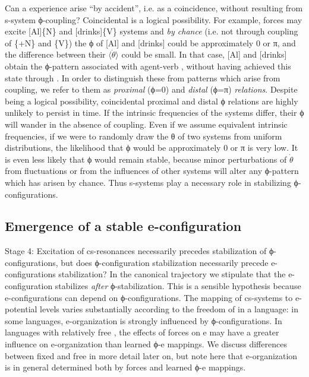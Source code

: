 Can a  experience arise “by accident”, i.e. as a coincidence, without resulting from s-system ϕ-coupling? Coincidental  is a logical possibility. For example,  forces may excite [Al]\{N\} and [drinks]\{V\} systems and \textit{by chance} (i.e. not through coupling of \{+N\} and \{V\}) the ϕ of [Al] and [drinks] could be approximately 0 or π, and the difference between their $\langle\dot{\theta}\rangle$ could be small. In that case, [Al] and [drinks] obtain the ϕ-pattern associated with agent-verb , without having achieved this state through . In order to distinguish these from patterns which arise from coupling, we refer to them as \textit{proximal} (ϕ=0) and \textit{distal} (ϕ=π) \textit{relations}. Despite being a logical possibility, coincidental proximal and distal ϕ relations are highly unlikely to persist in time. If the intrinsic frequencies of the systems differ, their ϕ will wander in the absence of coupling. Even if we assume equivalent intrinsic frequencies, if we were to randomly draw the θ of two systems from uniform distributions, the likelihood that ϕ would be approximately 0 or π is very low. It is even less likely that ϕ would remain stable, because minor perturbations of $\dot{\theta}$ from  fluctuations or from the influences of other systems will alter any ϕ-pattern which has arisen by chance. Thus s-systems play a necessary role in stabilizing ϕ-configurations.

\subsection{Emergence of a stable e-configuration}

Stage 4: Excitation of cs-resonances necessarily precedes stabilization of ϕ-con\-fig\-u\-ra\-tions, but does ϕ-con\-fig\-u\-ra\-tion stabilization necessarily precede e-con\-fig\-u\-ra\-tions stabilization? In the canonical trajectory we stipulate that the e-con\-fig\-u\-ra\-tion stabilizes \textit{after} ϕ-stabilization. This is a sensible hypothesis because e-con\-fig\-u\-ra\-tions can depend on ϕ-con\-fig\-u\-ra\-tions. The mapping of cs-sys\-tems to e-potential levels varies substantially according to the freedom of  in a language: in some languages, e-or\-ga\-ni\-za\-tion is strongly influenced by ϕ-con\-fig\-u\-ra\-tions. In languages with relatively free , the effects of  forces on e may have a greater influence on e-organization than learned ϕ-e mappings. We discuss differences between fixed and  free  in more detail later on, but note here that e-organization is in general determined both by  forces and learned ϕ-e mappings.

